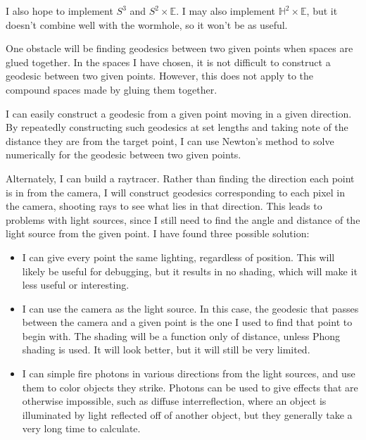 I also hope to implement $S^3$ and $S^2 \times \mathbb{E}$. I may also implement $\mathbb{H}^2 \times \mathbb{E}$, but it doesn't combine well with the wormhole, so it won't be as useful.


One obstacle will be finding geodesics between two given points when spaces are glued together. In the spaces I have chosen, it is not difficult to construct a geodesic between two given points. However, this does not apply to the compound spaces made by gluing them together.

I can easily construct a geodesic from a given point moving in a given direction. By repeatedly constructing such geodesics at set lengths and taking note of the distance they are from the target point, I can use Newton's method to solve numerically for the geodesic between two given points.

Alternately, I can build a raytracer. Rather than finding the direction each point is in from the camera, I will construct geodesics corresponding to each pixel in the camera, shooting rays to see what lies in that direction. This leads to problems with light sources, since I still need to find the angle and distance of the light source from the given point. I have found three possible solution:

\begin{itemize}

\item I can give every point the same lighting, regardless of position. This will likely be useful for debugging, but it results in no shading, which will make it less useful or interesting.

\item I can use the camera as the light source. In this case, the geodesic that passes between the camera and a given point is the one I used to find that point to begin with. The shading will be a function only of distance, unless Phong shading is used. It will look better, but it will still be very limited.

\item I can simple fire photons in various directions from the light sources, and use them to color objects they strike. Photons can be used to give effects that are otherwise impossible, such as diffuse interreflection, where an object is illuminated by light reflected off of another object, but they generally take a very long time to calculate.

\end{itemize}

